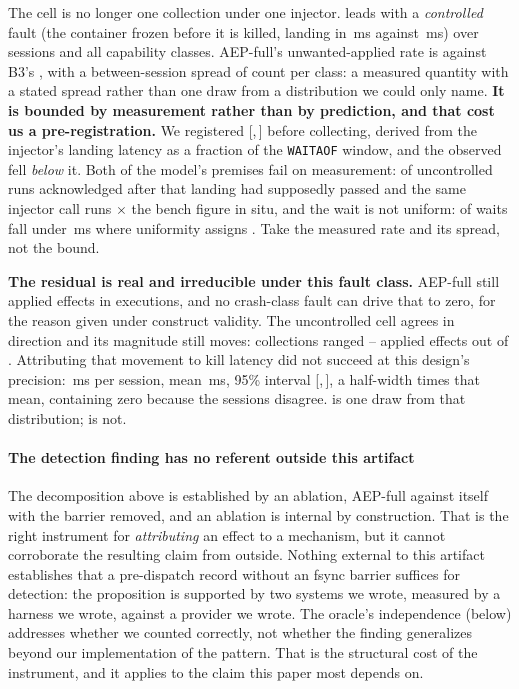 The cell is no longer one collection under one injector.
 leads with a \emph{controlled} fault (the
container frozen before it is killed, landing in \ControlledLanding{}\,ms
against \UncontrolledLanding{}\,ms) over \ArmASessions{} sessions and all
\ArmAClasses{} capability classes. AEP-full's unwanted-applied rate is
\ArmAAepRate{} against B3's \ArmABthreeRate{}, with a between-session spread of
\ArmASpreadMax{} count per class: a measured quantity with a stated spread
rather than one draw from a distribution we could only name. \textbf{It is
bounded by measurement rather than by prediction, and that cost us a
pre-registration.} We registered [\ArmABoundLow{},\,\ArmABoundHigh{}] before
collecting, derived from the injector's landing latency as a fraction of the
\texttt{WAITAOF} window, and the observed \ArmAAepRate{} fell \emph{below} it.
Both of the model's premises fail on measurement: \ModelAcksPastLanding{} of
\ModelAckN{} uncontrolled runs acknowledged after that landing had supposedly
passed and the same injector call runs \ModelInSituRatio{}$\times$ the bench
figure in situ, and the wait is not uniform: \ModelEmpiricalWindow{} of waits
fall under \ControlledLanding{}\,ms where uniformity assigns
\ModelUniformWindow{}. Take the measured rate and its spread, not the bound.

\textbf{The residual is real and irreducible under this fault class.} AEP-full
still applied \ArmAAepApplied{} effects in \ArmAAepN{} executions, and no
crash-class fault can drive that to zero, for the reason given under construct
validity. The uncontrolled cell agrees in direction and its magnitude still
moves: \ReplicationSessions{} collections ranged
\ReplicationAepMin{}--\ReplicationAepMax{} applied effects out of
\AepKillRuns{}. Attributing that movement to kill latency did not succeed at
this design's precision: \KillLatencyPerSession{}\,ms per session, mean
\KillLatencyMean{}\,ms, 95\% interval
[\KillLatencyLow{},\,\KillLatencyHigh{}], a half-width
\KillLatencyPrecisionRatio{} times that mean, containing zero because the
sessions disagree. \UnwantedPrevented{} is one draw from that distribution;
\ArmAAepRate{} is not.

\paragraph{The detection finding has no referent outside this artifact} The
decomposition above is established by an ablation, AEP-full against itself
with the barrier removed, and an ablation is internal by construction. That
is the right instrument for \emph{attributing} an effect to a mechanism, but it
cannot corroborate the resulting claim from outside. Nothing external to this
artifact establishes that a pre-dispatch record without an fsync barrier
suffices for detection: the proposition is supported by two systems we wrote,
measured by a harness we wrote, against a provider we wrote. The oracle's
independence (below) addresses whether we counted correctly, not whether the
finding generalizes beyond our implementation of the pattern. That is the
structural cost of the instrument, and it applies to the claim this paper
most depends on.

